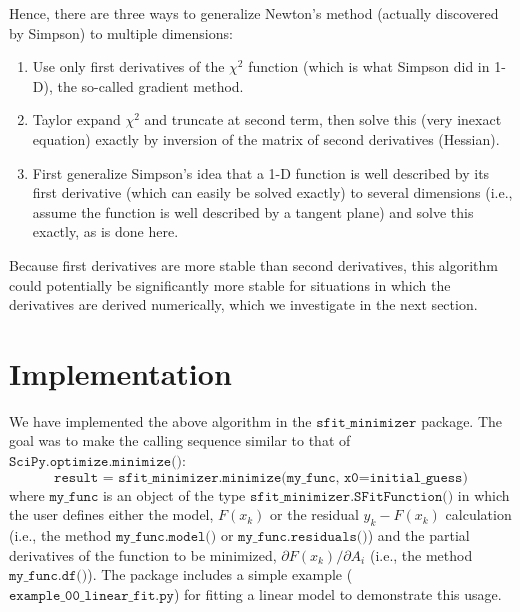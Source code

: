 \documentclass[preprint]{aastex631}
\newcommand{\minimize}{$\texttt{SciPy.optimize.minimize()}$}
\begin{document}
Hence, there are three ways to generalize Newton's method (actually discovered by Simpson)
to multiple dimensions:
\begin{enumerate}
\item{Use only first derivatives of the $\chi^2$ function (which is what Simpson did in
   1-D), the so-called gradient method.}
\item{Taylor expand $\chi^2$ and truncate at second term, then
   solve this (very inexact equation) exactly by inversion
   of the matrix of second derivatives (Hessian).}
\item{First generalize Simpson's idea that a 1-D function is well
   described by its first derivative (which can easily be solved
   exactly) to several dimensions (i.e., assume the function is well
   described by a tangent plane) and solve this exactly, as is done here.}
\end{enumerate}

Because first derivatives are more stable than second derivatives, this algorithm could potentially be significantly more stable for situations in which the derivatives are derived numerically, which we investigate in the next section.

\section{Implementation}

We have implemented the above algorithm in the $\texttt{sfit\_minimizer}$ package. The goal was to make the calling sequence similar to that of \minimize:
\begin{equation}
\texttt{result = sfit\_minimizer.minimize(my\_func, x0=initial\_guess)}
\end{equation}
where $\texttt{my\_func}$ is an object of the type $\texttt{sfit\_minimizer.SFitFunction()}$ in which the user defines either the model, $F(x_k)$ or the residual $y_k - F(x_k)$ calculation (i.e., the method $\texttt{my\_func.model()}$ or $\texttt{my\_func.residuals()}$) and the partial derivatives of the function to be minimized, $\partial F(x_k) / \partial A_i$ (i.e., the method $\texttt{my\_func.df()}$). The package includes a simple example ($\texttt{example\_00\_linear\_fit.py}$) for fitting a linear model to demonstrate this usage.
\end{document}
